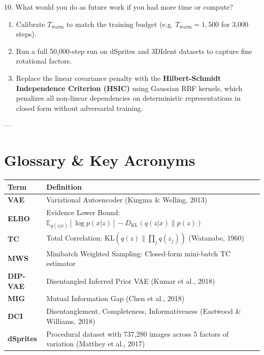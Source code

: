 \documentclass[11pt,a4paper]{article}
\begin{document}
\begin{questionbox}{10. What would you do as future work if you had more time or compute?}
\begin{answerbox}
\begin{enumerate}[noitemsep]
    \item Calibrate $T_{\mathrm{warm}}$ to match the training budget (e.g. $T_{\mathrm{warm}} = 1,500$ for 3,000 steps).
    \item Run a full 50,000-step run on dSprites and 3DIdent datasets to capture fine rotational factors.
    \item Replace the linear covariance penalty with the \textbf{Hilbert-Schmidt Independence Criterion (HSIC)} using Gaussian RBF kernels, which penalizes all non-linear dependencies on deterministic representations in closed form without adversarial training.
\end{enumerate}
\end{answerbox}
\end{questionbox}

---

\section{Glossary \& Key Acronyms}

\begin{table}[!htbp]
\centering
\small
\begin{tabular}{ll}
\toprule
\textbf{Term} & \textbf{Definition} \\
\midrule
\textbf{VAE} & Variational Autoencoder (Kingma \& Welling, 2013) \\
\textbf{ELBO} & Evidence Lower Bound: $\mathbb{E}_{q(z|x)}[\log p(x|z)] - D_{\mathrm{KL}}(q(z|x) \parallel p(z))$ \\
\textbf{TC} & Total Correlation: $\mathrm{KL}(q(z) \parallel \prod_j q(z_j))$ (Watanabe, 1960) \\
\textbf{MWS} & Minibatch Weighted Sampling: Closed-form mini-batch TC estimator \\
\textbf{DIP-VAE} & Disentangled Inferred Prior VAE (Kumar et al., 2018) \\
\textbf{MIG} & Mutual Information Gap (Chen et al., 2018) \\
\textbf{DCI} & Disentanglement, Completeness, Informativeness (Eastwood \& Williams, 2018) \\
\textbf{dSprites} & Procedural dataset with 737,280 images across 5 factors of variation (Matthey et al., 2017) \\
\bottomrule
\end{tabular}
\end{table}
\end{document}
